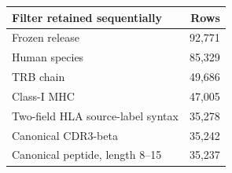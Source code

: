 \begin{tabular}{lr}
\toprule
Filter retained sequentially & Rows\\
\midrule
Frozen release & 92,771\\
Human species & 85,329\\
TRB chain & 49,686\\
Class-I MHC & 47,005\\
Two-field HLA source-label syntax & 35,278\\
Canonical CDR3-beta & 35,242\\
Canonical peptide, length 8--15 & 35,237\\
\bottomrule
\end{tabular}
